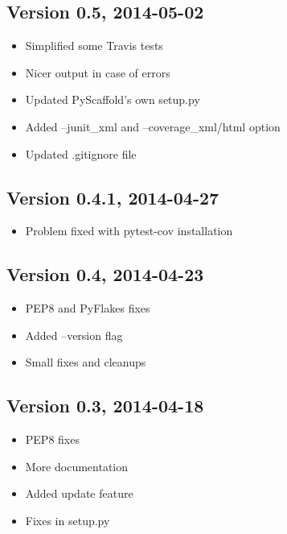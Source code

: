 \documentclass[letterpaper,10pt,english]{sphinxmanual}
\begin{document}
\subsection{Version 0.5, 2014-05-02}
\label{changes:version-0-5-2014-05-02}\begin{itemize}
\item {} 
Simplified some Travis tests

\item {} 
Nicer output in case of errors

\item {} 
Updated PyScaffold's own setup.py

\item {} 
Added --junit\_xml and --coverage\_xml/html option

\item {} 
Updated .gitignore file

\end{itemize}


\subsection{Version 0.4.1, 2014-04-27}
\label{changes:version-0-4-1-2014-04-27}\begin{itemize}
\item {} 
Problem fixed with pytest-cov installation

\end{itemize}


\subsection{Version 0.4, 2014-04-23}
\label{changes:version-0-4-2014-04-23}\begin{itemize}
\item {} 
PEP8 and PyFlakes fixes

\item {} 
Added --version flag

\item {} 
Small fixes and cleanups

\end{itemize}


\subsection{Version 0.3, 2014-04-18}
\label{changes:version-0-3-2014-04-18}\begin{itemize}
\item {} 
PEP8 fixes

\item {} 
More documentation

\item {} 
Added update feature

\item {} 
Fixes in setup.py

\end{itemize}
\end{document}
